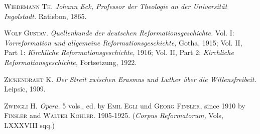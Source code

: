 \textsc{Wiedemann Th.} \textit{Johann Eck, Professor der Theologie an der Universität
Ingolstadt.} Ratisbon, 1865.

\textsc{Wolf Gustav.} \textit{Quellenkunde der deutschen Reformationsgeschichte.}
Vol. I: \textit{Vorreformation und allgemeine Reformationsgeschichte,} Gotha, 1915;
Vol. II, Part 1: \textit{Kirchliche Reformationsgeschichte,} 1916;
Vol. II, Part 2: \textit{Kirchliche Reformationsgeschichte,} Fortsetzung, 1922.

\textsc{Zickendraht K.} \textit{Der Streit zwischen Erasmus und Luther über die Willensfreibeit.}
Leipsic, 1909.

\textsc{Zwingli H.} \textit{Opera.} 5 vols., ed. by \textsc{Emil Egli} und \textsc{Georg Finsler,} since
1910 by \textsc{Finsler} and \textsc{Walter Köhler}. 1905-1925. (\textit{Corpus Reformatorum,}
Vols, LXXXVIII sqq.)
